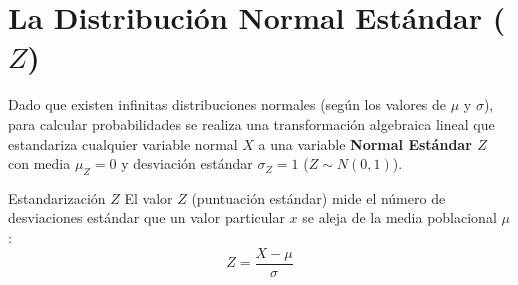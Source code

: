 \section{La Distribución Normal Estándar ($Z$)}
Dado que existen infinitas distribuciones normales (según los valores de $\mu$ y $\sigma$), para calcular probabilidades se realiza una transformación algebraica lineal que estandariza cualquier variable normal $X$ a una variable \textbf{Normal Estándar $Z$} con media $\mu_Z = 0$ y desviación estándar $\sigma_Z = 1$ ($Z \sim N(0, 1)$).

\begin{definicion}{Estandarización $Z$}
El valor $Z$ (puntuación estándar) mide el número de desviaciones estándar que un valor particular $x$ se aleja de la media poblacional $\mu$:
\begin{equation}
    Z = \frac{X - \mu}{\sigma}
\end{equation}
\end{definicion}

